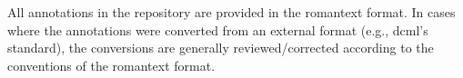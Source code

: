 
All annotations in the repository are provided in the
\gls{romantext} format. In cases where the annotations were
converted from an external format (e.g., \gls{dcml}'s
standard), the conversions are generally reviewed/corrected
according to the conventions of the \gls{romantext} format.